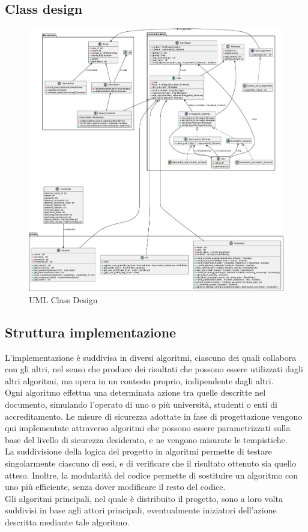 \documentclass[a4paper,12pt]{article}
\begin{document}
\subsection{Class design}
\begin{figure}[H]
    \centering
    \includegraphics[width=1\textwidth]{uml_design.eps}
    \caption{UML Class Design}
    \label{fig:class_design}
\end{figure}

\subsection{Struttura implementazione}
L'implementazione è suddivisa in diversi algoritmi, ciascuno dei quali collabora con gli altri, nel senso che produce dei risultati che possono essere utilizzati dagli altri algoritmi, ma opera in un contesto proprio, indipendente dagli altri.
\\[1em]
Ogni algoritmo effettua una determinata azione tra quelle descritte nel documento, simulando l'operato di uno o più università, studenti o enti di accreditamento. Le misure di sicurezza adottate in fase di progettazione vengono qui implementate attraverso algoritmi che possono essere parametrizzati sulla base del livello di sicurezza desiderato, e ne vengono misurate le tempistiche.
\\
La suddivisione della logica del progetto in algoritmi permette di testare singolarmente ciascuno di essi, e di verificare che il risultato ottenuto sia quello atteso. Inoltre, la modularità del codice permette di sostituire un algoritmo con uno più efficiente, senza dover modificare il resto del codice.
\\[1em] Gli algoritmi principali, nel quale è distribuito il progetto, sono a loro volta suddivisi in base agli attori principali, eventualmente iniziatori dell'azione descritta mediante tale algoritmo.
\end{document}
